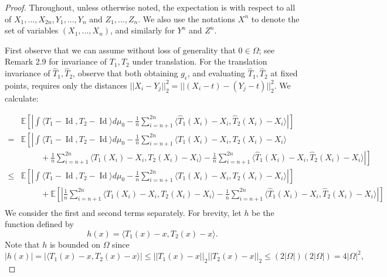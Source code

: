 \documentclass[nohyperref]{article}
\DeclareMathOperator*{\id}{Id}
\theoremstyle{definition}
\begin{document}
\begin{proof}
    Throughout, unless otherwise noted, the expectation is with respect to all of $X_1,...,X_{2n}, Y_1,...,Y_n$ and $Z_1,...,Z_n$. We also use the notations $X^n$ to denote the set of variables $(X_1,...,X_n)$, and similarly for $Y^n$ and $Z^n$.  
    
    First observe that we can assume without loss of generality that $0 \in \Omega$; see \cite{peyre2020computational} Remark 2.9 for invariance of $T_1,T_2$ under translation. For the translation invariance of $\hat{T}_1,\hat{T}_2$, observe that both obtaining $g_\epsilon$, and evaluating $\hat{T}_1, \hat{T}_2$ at fixed points, requires only the distances $||X_i - Y_j||_2^2 = ||(X_i - t) - (Y_j - t)||_2^2$.  We calculate:
    
    \begin{align*}
        &\mathbb{E}\left [ \left | \int \langle T_1 - \id, T_2 - \id \rangle d\mu_0 - \frac{1}{n} \sum_{i=n+1}^{2n} \langle \hat{T}_1(X_i) - X_i, \hat{T}_2(X_i) - X_i \rangle \right | \right ]  \\
        =& \mathbb{E}\left[ \left | 
            \int \langle T_1 - \id, T_2 - \id \rangle d\mu_0 - \frac{1}{n}\sum_{i=n+1}^{2n} \langle T_1(X_i) - X_i, T_2(X_i) - X_i\rangle \right. \right .\\
            & \hspace{1cm} + \left.\left.\frac{1}{n}\sum_{i=n+1}^{2n} \langle T_1(X_i) - X_i, T_2(X_i) - X_i\rangle 
            - \frac{1}{n} \sum_{i=n+1}^{2n} \langle \hat{T}_1(X_i) - X_i, \hat{T}_2(X_i) - X_i \rangle \right | \right ] \\
        \leq& \mathbb{E}\left[ \left | 
            \int \langle T_1 - \id, T_2 - \id \rangle d\mu_0 - \frac{1}{n}\sum_{i=n+1}^{2n} \langle T_1(X_i) - X_i, T_2(X_i) - X_i\rangle \right| \right ]\\
            & \hspace{1cm} + \mathbb{E}\left [\left|\frac{1}{n}\sum_{i=n+1}^{2n} \langle T_1(X_i) - X_i, T_2(X_i) - X_i\rangle 
            - \frac{1}{n} \sum_{i=n+1}^{2n} \langle \hat{T}_1(X_i) - X_i, \hat{T}_2(X_i) - X_i \rangle \right | \right ] \\
    \end{align*}
    We consider the first and second terms separately. For brevity, let $h$ be the function defined by
    $$h(x) = \langle T_1(x) - x, T_2(x) - x\rangle.$$
    Note that $h$ is bounded on $\Omega$ since 
    $$|h(x)| = |\langle T_1(x) - x, T_2(x) - x\rangle| \leq ||T_1(x) - x||_2||T_2(x) - x||_2 \leq (2|\Omega|)(2|\Omega|) = 4|\Omega|^2,$$

\end{proof}
\end{document}
